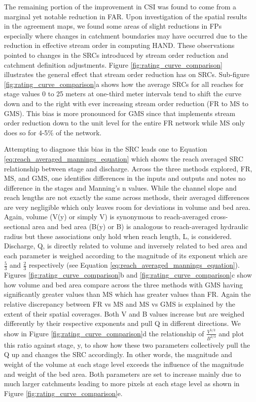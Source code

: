 \documentclass[draft]{dependencies/agujournal2019}
\begin{document}
The remaining portion of the improvement in CSI was found to come from a marginal yet notable reduction in FAR.
Upon investigation of the spatial results in the agreement maps, we found some areas of slight reductions in FPs especially where changes in catchment boundaries may have occurred due to the reduction in effective stream order in computing HAND.
These observations pointed to changes in the SRCs introduced by stream order reduction and catchment definition adjustments.
Figure \ref{fig:rating_curve_comparison} illustrates the general effect that stream order reduction has on SRCs.
Sub-figure \ref{fig:rating_curve_comparison}a shows how the average SRCs for all reaches for stage values 0 to 25 meters at one-third meter intervals tend to shift the curve down and to the right with ever increasing stream order reduction (FR to MS to GMS). 
This bias is more pronounced for GMS since that implements stream order reduction down to the unit level for the entire FR network while MS only does so for 4-5\% of the network.

Attempting to diagnose this bias in the SRC leads one to Equation \ref{eq:reach_averaged_mannings_equation} which shows the reach averaged SRC relationship between stage and discharge.
Across the three methods explored, FR, MS, and GMS, one identifies differences in the inputs and outputs and notes no difference in the stages and Manning's n values.
While the channel slope and reach lengths are not exactly the same across methods, their averaged differences are very negligible which only leaves room for deviations in volume and bed area.
Again, volume (V(y) or simply V) is synonymous to reach-averaged cross-sectional area and bed area (B(y) or B) is analogous to reach-averaged hydraulic radius but these associations only hold when reach length, L, is considered.
Discharge, Q, is directly related to volume and inversely related to bed area and each parameter is weighed according to the magnitude of its exponent which are $\frac{5}{3}$ and $\frac{2}{3}$ respectively (see Equation \ref{eq:reach_averaged_mannings_equation}). 
Figures \ref{fig:rating_curve_comparison}b and \ref{fig:rating_curve_comparison}c show how volume and bed area compare across the three methods with GMS having significantly greater values than MS which has greater values than FR.
Again the relative discrepancy between FR vs MS and MS vs GMS is explained by the extent of their spatial coverages.
Both V and B values increase but are weighed differently by their respective exponents and pull Q in different directions.
We show in Figure \ref{fig:rating_curve_comparison}d the relationship of $\frac{V^{5/3}}{B^{2/3}}$ and plot this ratio against stage, y, to show how these two parameters collectively pull the Q up and changes the SRC accordingly.
In other words, the magnitude and weight of the volume at each stage level exceeds the influence of the magnitude and weight of the bed area.
Both parameters are set to increase mainly due to much larger catchments leading to more pixels at each stage level as shown in Figure \ref{fig:rating_curve_comparison}e.
\end{document}
